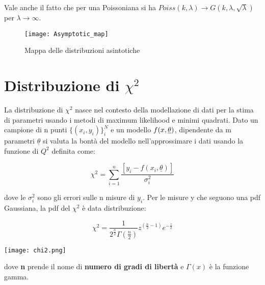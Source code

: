 \documentclass[11pt,a4paper]{book}
\begin{document}
Vale anche il fatto che per una Poissoniana si ha $Poiss(k,\lambda) \rightarrow G(k,\lambda, \sqrt{\lambda})$ per $\lambda \rightarrow \infty $.

 
\begin{figure}[!ht]
\vspace{0.2in}
\texttt{[image: Asymptotic\_map]}	
\centering
\vspace{0.2in}
\caption{Mappa delle distribuzioni asintotiche}
\end{figure}


\section{Distribuzione di $\chi^2$}


La distribuzione di $\chi^2$ nasce nel contesto della modellazione di dati per la stima di parametri usando i metodi di maximum likelihood e minimi quadrati. Dato un campione di n punti $\{(x_i,y_i)\}_{i}^N$ e un modello $f(x, \bold{\underline{\theta}})$, dipendente da m parametri $\underline{\theta}$ si valuta la bont\`{a} del modello nell'approssimare i dati usando la funzione di $Q^2$ definita come:

\begin{equation}
	\chi^2 = \sum_{i=1}^{n}\dfrac{[y_i - f(x_i,\underline{\theta})]}{\sigma^2_i}
\end{equation}

dove le $\sigma^2_i$ sono gli errori sulle n misure di $y_i$. 
\newline
Per le misure y che seguono una pdf Gaussiana, la pdf del $\chi^2$ \`{e} data distribuzione:


\vspace{0.3in}

  \begin{minipage}{0.5\textwidth}
\begin{equation*}
	\chi^2 = \dfrac{1}{2^{\frac{n}{2}}\Gamma(\frac{n}{2})}z^{(\frac{n}{2}-1)}e^{-\frac{z}{2}}
\end{equation*}
  \end{minipage}
  \begin{minipage}{.4\textwidth}
    \centering
    \texttt{[image: chi2.png]}

  \end{minipage}
\vspace{0.3in}

dove \textbf{n} prende il nome di \textbf{numero di gradi di libert\`{a}} e $\Gamma(x)$ \`{e} la funzione gamma.
\end{document}
